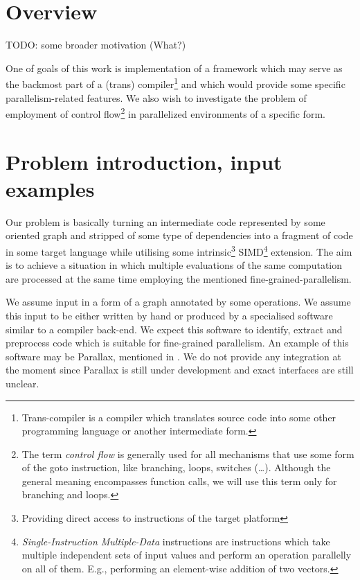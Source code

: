 
\section{Overview}

TODO: some broader motivation (What?)

One of goals of this work is implementation of a framework which may serve as the backmost part of a (trans) compiler\footnote{Trans-compiler is a compiler which translates source code into some other programming language or another intermediate form.} and which would provide some specific parallelism-related features. We also wish to investigate the problem of employment of control flow\footnote{The term \emph{control flow} is generally used for all mechanisms that use some form of the goto instruction, like branching, loops, switches (\dots). Although the general meaning encompasses function calls, we will use this term only for branching and loops.} in parallelized environments of a specific form.

\section{Problem introduction, input examples}

Our problem is basically turning an intermediate code represented by some oriented graph and stripped of some type of dependencies into a fragment of code in some target language while utilising some intrinsic\footnote{Providing direct access to instructions of the target platform} SIMD\footnote{\emph{Single-Instruction Multiple-Data} instructions are instructions which take multiple independent sets of input values and perform an operation parallelly on all of them. E.g., performing an element-wise addition of two vectors.} extension. The aim is to achieve a situation in which multiple evaluations of the same computation are processed at the same time employing the mentioned fine-grained-parallelism. 


We assume input in a form of a graph annotated by some operations. We assume this input to be either written by hand or produced by a specialised software similar to a compiler back-end. We expect this software to identify, extract and preprocess code which is suitable for fine-grained parallelism.  An example of this software may be Parallax, mentioned in \cite{pipelines}. We do not provide any integration at the moment since Parallax is still under development and exact interfaces are still unclear.


